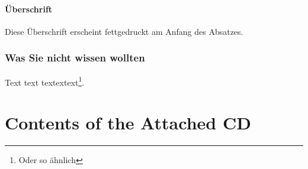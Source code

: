 \documentclass[11pt,a4paper,twoside]{article}
\begin{document}
\paragraph{Überschrift}
Diese Überschrift erscheint fettgedruckt am Anfang des Absatzes.

\subsubsection{Was Sie nicht wissen wollten}

Text text textextext\footnote{Oder so ähnlich}.


\cleardoublepage
\fancyhead[LE,RO,LO,RE]{} %
\section*{Contents of the Attached CD}

\cleardoublepage










\end{document}
